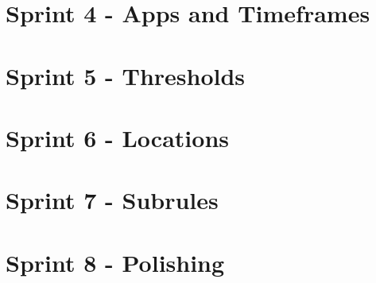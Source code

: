 \section{Sprint 4 - Apps and Timeframes}
\label{appendix:slides_4}


\section{Sprint 5 - Thresholds}
\label{appendix:slides_5}


\section{Sprint 6 - Locations}
\label{appendix:slides_6}


\section{Sprint 7 - Subrules}
\label{appendix:slides_7}


\section{Sprint 8 - Polishing}
\label{appendix:slides_8}

